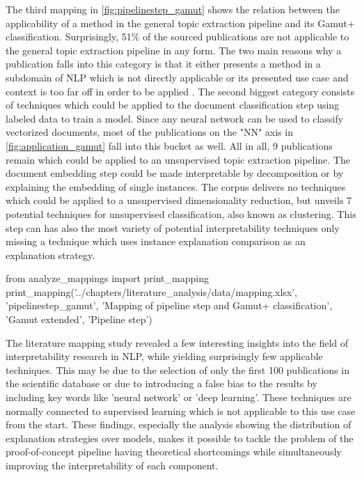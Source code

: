 The third mapping in \autoref{fig:pipelinestep_gamut} shows the relation between the applicability of a method in the general topic extraction pipeline and its Gamut+ classification. Surprisingly, 51\% of the sourced publications are not applicable to the general topic extraction pipeline in any form. The two main reasons why a publication falls into this category is that it either presents a method in a subdomain of NLP which is not directly applicable \cite{goyalTransparentAISystems2016} \cite{itoTextVisualizingNeuralNetwork2018a} or its presented use case and context is too far off in order to be applied \cite{8591457} \cite{gengHumancentricTransferLearning}.
The second biggest category consists of techniques which could be applied to the document classification step using labeled data to train a model. Since any neural network can be used to classify vectorized documents, most of the publications on the "NN" axis in \autoref{fig:application_gamut} fall into this bucket as well. All in all, 9 publications remain which could be applied to an unsupervised topic extraction pipeline. 
The document embedding step could be made interpretable by decomposition or by explaining the embedding of single instances. 
The corpus delivers no techniques which could be applied to a unsupervised dimensionality reduction, but unveils 7 potential techniques for unsupervised classification, also known as clustering. This step can has also the most variety of potential interpretability techniques only missing a technique which uses instance explanation comparison as an explanation strategy.

\begin{pycode}
from analyze_mappings import print_mapping
print_mapping('../chapters/literature_analysis/data/mapping.xlsx', 'pipelinestep_gamut', 'Mapping of pipeline step and Gamut+ classification', 'Gamut extended', 'Pipeline step')
\end{pycode}

The literature mapping study revealed a few interesting insights into the field of interpretability research in NLP, while yielding surprisingly few applicable techniques. This may be due to the selection of only the first 100 publications in the scientific database or due to introducing a false bias to the results by including key words like 'neural network' or 'deep learning'. These techniques are normally connected to supervised learning which is not applicable to this use case from the start. These findings, especially the analysis showing the distribution of explanation strategies over models, makes it possible to tackle the problem of the proof-of-concept pipeline having theoretical shortcomings while simultaneously improving the interpretability of each component.
